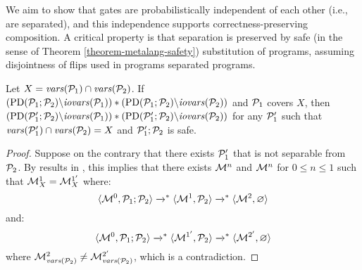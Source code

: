 We aim to show that gates are probabilistically independent of each
other (i.e., are separated), and this independence supports
correctness-preserving composition. A critical property is that
separation is preserved by safe (in the sense of Theorem
\ref{theorem-metalang-safety}) substitution of programs, assuming
disjointness of flips used in programs separated programs.
\begin{lemma}
  \label{lemma-scope}
  Let $X = \mathit{vars}(\mathcal{P}_1) \cap \mathit{vars}(\mathcal{P}_2)$.
  If $(\mathrm{PD}(\mathcal{P}_1;\mathcal{P}_2)\backslash\mathit{iovars}(\mathcal{P}_1)) *
  (\mathrm{PD}(\mathcal{P}_1;\mathcal{P}_2)\backslash\mathit{iovars}(\mathcal{P}_2))$ and $\mathcal{P}_1$
  covers $X$, then 
  $(\mathrm{PD}(\mathcal{P}_1';\mathcal{P}_2)\backslash\mathit{iovars}(\mathcal{P}_1)) *
  (\mathrm{PD}(\mathcal{P}_1';\mathcal{P}_2)\backslash\mathit{iovars}(\mathcal{P}_2))$ for any
  $\mathcal{P}_1'$ such that $\mathit{vars}(\mathcal{P}_1') \cap \mathit{vars}(\mathcal{P}_2) = X$ and
  $\mathcal{P}_1';\mathcal{P}_2$ is safe.
\end{lemma}
\begin{proof}
  Suppose on the contrary that there exists $\mathcal{P}_1'$ that is not
  separable from $\mathcal{P}_2$. By results in
  \cite{barthe2019probabilistic}, this implies that there
  exists $\mathcal{M}^n$ and $\mathcal{M}^n$ for $0 \le n \le 1$ such that
  $\mathcal{M}^1_X = \mathcal{M}^{1'}_X$ where:
  $$
  \langle \mathcal{M}^0,\mathcal{P}_1;\mathcal{P}_2 \rangle \xrightarrow{}^{*} \langle \mathcal{M}^1,\mathcal{P}_2 \rangle \xrightarrow{}^{*}
  \langle \mathcal{M}^2,\varnothing \rangle
  $$
  and:
  $$
  \langle \mathcal{M}^{0},\mathcal{P}_1;\mathcal{P}_2 \rangle \xrightarrow{}^{*} \langle \mathcal{M}^{1'},\mathcal{P}_2 \rangle \xrightarrow{}^{*}
  \langle \mathcal{M}^{2'},\varnothing \rangle
  $$
  where $\mathcal{M}^2_{\mathit{vars}(\mathcal{P}_2)} \ne \mathcal{M}^{2'}_{\mathit{vars}(\mathcal{P}_2)}$, which is a
  contradiction.
\end{proof}

